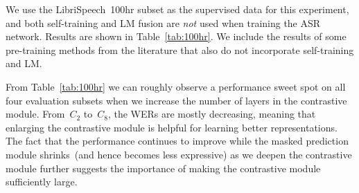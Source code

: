 \documentclass{article}
\begin{document}
We use the LibriSpeech~100hr subset as the supervised data for this experiment, and both self-training and LM fusion are {\it not} used when training the ASR network.
Results are shown in Table~\ref{tab:100hr}.
We include the results of some pre-training methods from the literature that also do not incorporate self-training and LM.

\begin{table}[htbp]
  \caption{WERs~(\%) when using the LibriSpeech~100hr subset as supervised data. For all methods, both self-training and LM fusion are not used. References are where the numbers are quoted from.}
  \vskip 0.1in
  \label{tab:100hr}
  \centering
\end{table}

From Table~\ref{tab:100hr} we can roughly observe a performance sweet spot on all four evaluation subsets when we increase the number of layers in the contrastive module.
From~$C_{2}$ to~$C_{8}$, the WERs are mostly decreasing, meaning that enlarging the contrastive module is helpful for learning better representations.
The fact that the performance continues to improve while the masked prediction module shrinks~(and hence becomes less expressive) as we deepen the contrastive module further suggests the importance of making the contrastive module sufficiently large.
\end{document}
